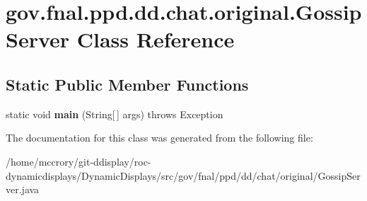 \hypertarget{classgov_1_1fnal_1_1ppd_1_1dd_1_1chat_1_1original_1_1GossipServer}{\section{gov.\-fnal.\-ppd.\-dd.\-chat.\-original.\-Gossip\-Server Class Reference}
\label{classgov_1_1fnal_1_1ppd_1_1dd_1_1chat_1_1original_1_1GossipServer}
}
\subsection*{Static Public Member Functions}
\begin{DoxyCompactItemize}
\item 
\hypertarget{classgov_1_1fnal_1_1ppd_1_1dd_1_1chat_1_1original_1_1GossipServer_a9c1427cb34cf4cbabb296d30e9c74ebc}{static void {\bfseries main} (String\mbox{[}$\,$\mbox{]} args)  throws Exception }\label{classgov_1_1fnal_1_1ppd_1_1dd_1_1chat_1_1original_1_1GossipServer_a9c1427cb34cf4cbabb296d30e9c74ebc}

\end{DoxyCompactItemize}


The documentation for this class was generated from the following file\-:\begin{DoxyCompactItemize}
\item 
/home/mccrory/git-\/ddisplay/roc-\/dynamicdisplays/\-Dynamic\-Displays/src/gov/fnal/ppd/dd/chat/original/Gossip\-Server.\-java\end{DoxyCompactItemize}

